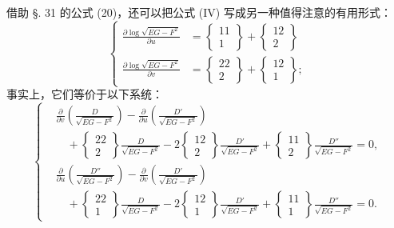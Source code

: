 借助 \S. 31 的公式 (20)，还可以把公式 (IV) 写成另一种值得注意的有用形式：
\[
\left\{
\begin{aligned}
 \frac{\partial\log\sqrt{EG-F^2}}{\partial u}
 &=
 \left\{\begin{matrix}11\\1\end{matrix}\right\}
 +\left\{\begin{matrix}12\\2\end{matrix}\right\}\\
 \frac{\partial\log\sqrt{EG-F^2}}{\partial v}
 &=
 \left\{\begin{matrix}22\\2\end{matrix}\right\}
 +\left\{\begin{matrix}12\\1\end{matrix}\right\};
\end{aligned}
\right.
\]
事实上，它们等价于以下系统：
\begin{equation}\tag{IV*}
\left\{
\begin{aligned}
&\frac{\partial}{\partial v}\left(\frac{D}{\sqrt{EG-F^2}}\right)
-\frac{\partial}{\partial u}\left(\frac{D'}{\sqrt{EG-F^2}}\right)\\
&\quad
+\left\{\begin{matrix}22\\2\end{matrix}\right\}\frac{D}{\sqrt{EG-F^2}}
-2\left\{\begin{matrix}12\\2\end{matrix}\right\}\frac{D'}{\sqrt{EG-F^2}}
+\left\{\begin{matrix}11\\2\end{matrix}\right\}\frac{D''}{\sqrt{EG-F^2}}=0,\\[0.35em]
&\frac{\partial}{\partial u}\left(\frac{D''}{\sqrt{EG-F^2}}\right)
-\frac{\partial}{\partial v}\left(\frac{D'}{\sqrt{EG-F^2}}\right)\\
&\quad
+\left\{\begin{matrix}22\\1\end{matrix}\right\}\frac{D}{\sqrt{EG-F^2}}
-2\left\{\begin{matrix}12\\1\end{matrix}\right\}\frac{D'}{\sqrt{EG-F^2}}
+\left\{\begin{matrix}11\\1\end{matrix}\right\}\frac{D''}{\sqrt{EG-F^2}}=0.
\end{aligned}
\right.
\end{equation}

